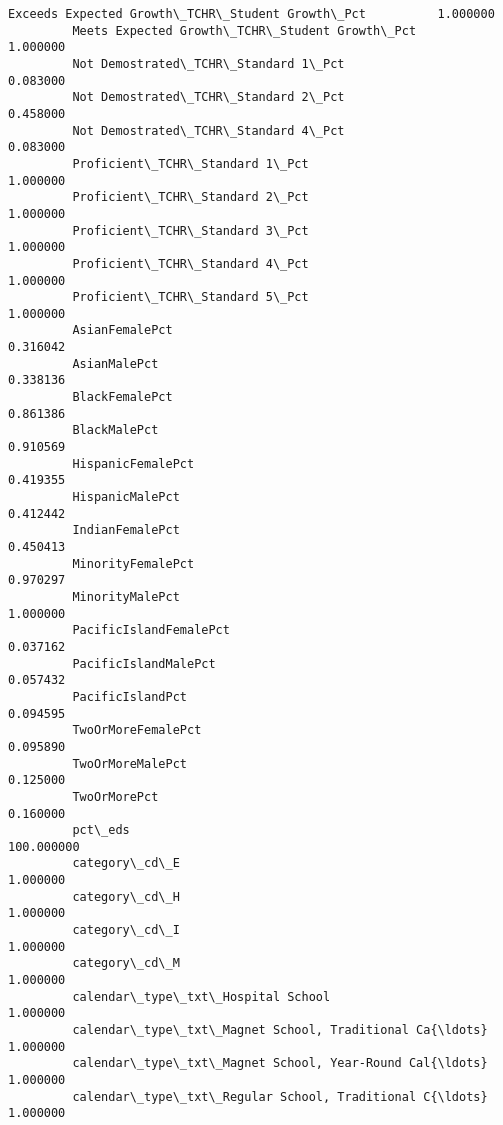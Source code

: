 \documentclass[11pt]{article}
\begin{document}
\begin{Verbatim}[commandchars=\\\{\}]
         Exceeds Expected Growth\_TCHR\_Student Growth\_Pct          1.000000  
         Meets Expected Growth\_TCHR\_Student Growth\_Pct            1.000000  
         Not Demostrated\_TCHR\_Standard 1\_Pct                      0.083000  
         Not Demostrated\_TCHR\_Standard 2\_Pct                      0.458000  
         Not Demostrated\_TCHR\_Standard 4\_Pct                      0.083000  
         Proficient\_TCHR\_Standard 1\_Pct                           1.000000  
         Proficient\_TCHR\_Standard 2\_Pct                           1.000000  
         Proficient\_TCHR\_Standard 3\_Pct                           1.000000  
         Proficient\_TCHR\_Standard 4\_Pct                           1.000000  
         Proficient\_TCHR\_Standard 5\_Pct                           1.000000  
         AsianFemalePct                                           0.316042  
         AsianMalePct                                             0.338136  
         BlackFemalePct                                           0.861386  
         BlackMalePct                                             0.910569  
         HispanicFemalePct                                        0.419355  
         HispanicMalePct                                          0.412442  
         IndianFemalePct                                          0.450413  
         MinorityFemalePct                                        0.970297  
         MinorityMalePct                                          1.000000  
         PacificIslandFemalePct                                   0.037162  
         PacificIslandMalePct                                     0.057432  
         PacificIslandPct                                         0.094595  
         TwoOrMoreFemalePct                                       0.095890  
         TwoOrMoreMalePct                                         0.125000  
         TwoOrMorePct                                             0.160000  
         pct\_eds                                                100.000000  
         category\_cd\_E                                            1.000000  
         category\_cd\_H                                            1.000000  
         category\_cd\_I                                            1.000000  
         category\_cd\_M                                            1.000000  
         calendar\_type\_txt\_Hospital School                        1.000000  
         calendar\_type\_txt\_Magnet School, Traditional Ca{\ldots}       1.000000  
         calendar\_type\_txt\_Magnet School, Year-Round Cal{\ldots}       1.000000  
         calendar\_type\_txt\_Regular School, Traditional C{\ldots}       1.000000  

\end{Verbatim}
\end{document}
